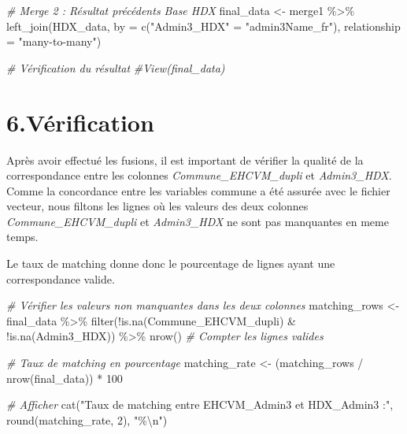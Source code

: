 \documentclass[
]{article}
\newenvironment{Shaded}{\begin{snugshade}}{\end{snugshade}}
\newcommand{\AttributeTok}[1]{\textcolor[rgb]{0.77,0.63,0.00}{#1}}
\newcommand{\CommentTok}[1]{\textcolor[rgb]{0.56,0.35,0.01}{\textit{#1}}}
\newcommand{\DecValTok}[1]{\textcolor[rgb]{0.00,0.00,0.81}{#1}}
\newcommand{\FunctionTok}[1]{\textcolor[rgb]{0.00,0.00,0.00}{#1}}
\newcommand{\NormalTok}[1]{#1}
\newcommand{\OtherTok}[1]{\textcolor[rgb]{0.56,0.35,0.01}{#1}}
\newcommand{\SpecialCharTok}[1]{\textcolor[rgb]{0.00,0.00,0.00}{#1}}
\newcommand{\StringTok}[1]{\textcolor[rgb]{0.31,0.60,0.02}{#1}}
\begin{document}
\begin{Shaded}
\begin{Highlighting}[]
\CommentTok{\# Merge 2 : Résultat précédents Base HDX}
\NormalTok{final\_data }\OtherTok{\textless{}{-}}\NormalTok{ merge1 }\SpecialCharTok{\%\textgreater{}\%}
  \FunctionTok{left\_join}\NormalTok{(HDX\_data, }\AttributeTok{by =} \FunctionTok{c}\NormalTok{(}\StringTok{"Admin3\_HDX"} \OtherTok{=} \StringTok{"admin3Name\_fr"}\NormalTok{),}
            \AttributeTok{relationship =} \StringTok{"many{-}to{-}many"}\NormalTok{)}

\CommentTok{\# Vérification du résultat}
\CommentTok{\#View(final\_data)}
\end{Highlighting}
\end{Shaded}

\hypertarget{vuxe9rification}{%
\section{6.Vérification}\label{vuxe9rification}}

Après avoir effectué les fusions, il est important de vérifier la
qualité de la correspondance entre les colonnes
\emph{Commune\_EHCVM\_dupli} et \emph{Admin3\_HDX}. Comme la concordance
entre les variables commune a été assurée avec le fichier vecteur, nous
filtons les lignes où les valeurs des deux colonnes
\emph{Commune\_EHCVM\_dupli} et \emph{Admin3\_HDX} ne sont pas
manquantes en meme temps.

Le taux de matching donne donc le pourcentage de lignes ayant une
correspondance valide.

\begin{Shaded}
\begin{Highlighting}[]
\CommentTok{\# Vérifier les valeurs non manquantes dans les deux colonnes}
\NormalTok{matching\_rows }\OtherTok{\textless{}{-}}\NormalTok{ final\_data }\SpecialCharTok{\%\textgreater{}\%}
  \FunctionTok{filter}\NormalTok{(}\SpecialCharTok{!}\FunctionTok{is.na}\NormalTok{(Commune\_EHCVM\_dupli) }\SpecialCharTok{\&} \SpecialCharTok{!}\FunctionTok{is.na}\NormalTok{(Admin3\_HDX)) }\SpecialCharTok{\%\textgreater{}\%} 
  \FunctionTok{nrow}\NormalTok{()  }\CommentTok{\# Compter les lignes valides}

\CommentTok{\# Taux de matching en pourcentage}
\NormalTok{matching\_rate }\OtherTok{\textless{}{-}}\NormalTok{ (matching\_rows }\SpecialCharTok{/} \FunctionTok{nrow}\NormalTok{(final\_data)) }\SpecialCharTok{*} \DecValTok{100}

\CommentTok{\# Afficher}
\FunctionTok{cat}\NormalTok{(}\StringTok{"Taux de matching entre EHCVM\_Admin3 et HDX\_Admin3 :"}\NormalTok{, }
    \FunctionTok{round}\NormalTok{(matching\_rate, }\DecValTok{2}\NormalTok{), }\StringTok{"\%}\SpecialCharTok{\textbackslash{}n}\StringTok{"}\NormalTok{)}
\end{Highlighting}
\end{Shaded}
\end{document}
